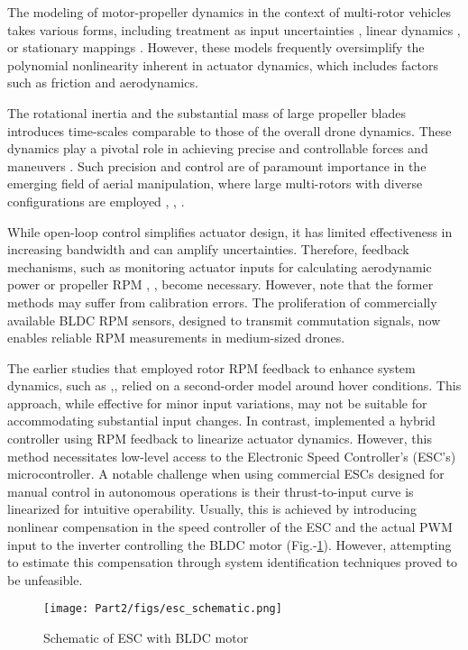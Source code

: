 \par The modeling of motor-propeller dynamics in the context of multi-rotor
vehicles takes various forms, including treatment as input uncertainties \cite{liang2021geometric}, linear dynamics \cite{pounds2010modelling}, or stationary mappings \cite{tayebi2006attitude}. However, these models frequently oversimplify the polynomial nonlinearity inherent in actuator dynamics, which includes factors such as friction and aerodynamics.

The rotational inertia and the substantial mass of large propeller blades
introduces time-scales comparable to those of the overall drone dynamics. These
dynamics play a pivotal role in achieving precise and controllable forces and
maneuvers \cite{hamandi2021design}. Such precision and control are of
paramount importance in the emerging field of aerial manipulation, where large
multi-rotors with diverse configurations are employed \cite{ding2021design},
\cite{ryll20176d}, \cite{jiang2017estimation}.

While open-loop control simplifies actuator design, it has limited
effectiveness in increasing bandwidth \cite{charla2022enhancing} and can
amplify uncertainties. Therefore, feedback mechanisms, such as monitoring
actuator inputs for calculating aerodynamic power \cite{B_Manony} or propeller
RPM \cite{franchi2017adaptive}, \cite{bangura2017thrust}, become necessary.
However, note that the former methods may suffer from calibration errors. The
proliferation of commercially available BLDC RPM sensors, designed to transmit
commutation signals, now enables reliable RPM measurements in medium-sized
drones.

The earlier studies that employed rotor RPM feedback to enhance system
dynamics, such as
\cite{pounds2009design},\cite{pounds2007system},\cite{mahony2012multirotor}
relied on a second-order model around hover conditions. This approach, while
effective for minor input variations, may not be suitable for accommodating
substantial input changes. In contrast, \cite{franchi2017adaptive} implemented
a hybrid controller using RPM feedback to linearize actuator dynamics. However,
this method necessitates low-level access to the Electronic Speed Controller's
(ESC's) microcontroller. A notable challenge when using commercial ESCs designed for manual control in autonomous operations
is their thrust-to-input curve is linearized for intuitive
operability. Usually, this is achieved by introducing nonlinear compensation in
the speed controller of the ESC and the actual PWM input to the inverter
controlling the BLDC motor (Fig.-\ref{fig::bldc_diag}). However, attempting to
estimate this compensation through system identification techniques proved to
be unfeasible.
\begin{figure}[h]
    \centering
    \texttt{[image: Part2/figs/esc\_schematic.png]}
    \caption{Schematic of ESC with BLDC motor}
    \label{fig::bldc_diag}
\end{figure}

